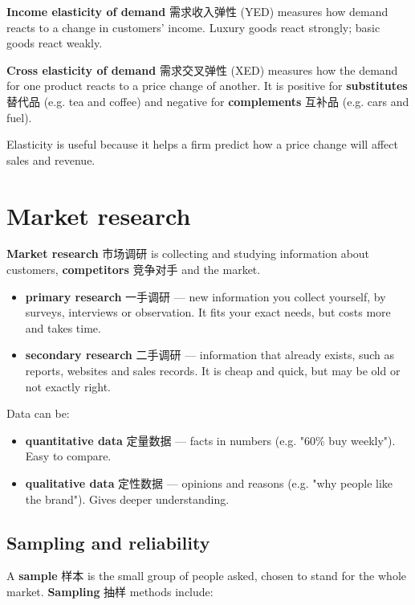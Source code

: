 \documentclass[11pt]{article}
\begin{document}
\textbf{Income elasticity of demand} 需求收入弹性 (YED) measures how demand reacts to a change in customers' income. Luxury goods react strongly; basic goods react weakly.

\textbf{Cross elasticity of demand} 需求交叉弹性 (XED) measures how the demand for one product reacts to a price change of another. It is positive for \textbf{substitutes} 替代品 (e.g. tea and coffee) and negative for \textbf{complements} 互补品 (e.g. cars and fuel).

Elasticity is useful because it helps a firm predict how a price change will affect sales and revenue.

\section*{Market research}

\textbf{Market research} 市场调研 is collecting and studying information about customers, \textbf{competitors} 竞争对手 and the market.

\begin{itemize}
\item \textbf{primary research} 一手调研 — new information you collect yourself, by surveys, interviews or observation. It fits your exact needs, but costs more and takes time.

\item \textbf{secondary research} 二手调研 — information that already exists, such as reports, websites and sales records. It is cheap and quick, but may be old or not exactly right.

\end{itemize}

Data can be:

\begin{itemize}
\item \textbf{quantitative data} 定量数据 — facts in numbers (e.g. "60\% buy weekly"). Easy to compare.

\item \textbf{qualitative data} 定性数据 — opinions and reasons (e.g. "why people like the brand"). Gives deeper understanding.

\end{itemize}

\subsection*{Sampling and reliability}

A \textbf{sample} 样本 is the small group of people asked, chosen to stand for the whole market. \textbf{Sampling} 抽样 methods include:
\end{document}
